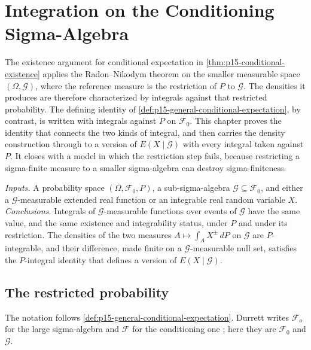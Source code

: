 \chapter{Integration on the Conditioning Sigma-Algebra}
\label{sec:p15-w02c-p15-007-restricted-integrals}

The existence argument for conditional expectation in
\cref{thm:p15-conditional-existence} applies the Radon--Nikodym theorem
on the smaller measurable space \((\Omega,\mathcal G)\), where the
reference measure is the restriction of \(P\) to \(\mathcal G\).
The densities it produces are therefore characterized by integrals
against that restricted probability. The defining identity of
\cref{def:p15-general-conditional-expectation}, by contrast, is written
with integrals against \(P\) on \(\mathcal F_0\). This chapter proves the
identity that connects the two kinds of integral, and then carries the
density construction through to a version of \(E(X\mid\mathcal G)\) with
every integral taken against \(P\). It closes with a model in which the
restriction step fails, because restricting a sigma-finite measure to a
smaller sigma-algebra can destroy sigma-finiteness.

\emph{Inputs.} A probability space \((\Omega,\mathcal F_0,P)\), a
sub-sigma-algebra \(\mathcal G\subseteq\mathcal F_0\), and either a
\(\mathcal G\)-measurable extended real function or an integrable real
random variable \(X\).
\emph{Conclusions.} Integrals of \(\mathcal G\)-measurable functions over
events of \(\mathcal G\) have the same value, and the same existence and
integrability status, under \(P\) and under its restriction. The
densities of the two measures \(A\mapsto\int_AX^\pm\,dP\) on
\(\mathcal G\) are \(P\)-integrable, and their difference, made finite on
a \(\mathcal G\)-measurable null set, satisfies the \(P\)-integral identity
that defines a version of \(E(X\mid\mathcal G)\).

\section{The restricted probability}
\label{sec:p15-w02c-p15-007-restriction}

The notation follows \cref{def:p15-general-conditional-expectation}.
Durrett writes \(\mathcal F_o\) for the large sigma-algebra and
\(\mathcal F\) for the conditioning one \cite[p.~205]{DurrettPTEAuthor2019};
here they are \(\mathcal F_0\) and \(\mathcal G\).

